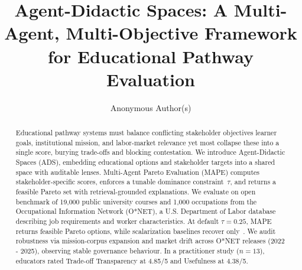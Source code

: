 \documentclass{article}
\title{Agent-Didactic Spaces: A Multi-Agent, Multi-Objective Framework for Educational Pathway Evaluation}
\author{
Anonymous Author(s)
}
\newcommand{\ADS}{\textsc{ADS}\xspace}
\newcommand{\MAPE}{\textsc{MAPE}\xspace}
\newcommand{\IndustryPartner}{\textit{industry partner (anonymized)}}
\begin{document}
\maketitle

\begin{abstract}
Educational pathway systems must balance conflicting stakeholder objectives learner goals, institutional mission, and labor-market relevance   yet most collapse these into a single score, burying trade-offs and blocking contestation.
We introduce Agent-Didactic Spaces (\ADS), embedding educational options and stakeholder targets into a shared space with auditable lenses. Multi-Agent Pareto Evaluation (\MAPE) computes stakeholder-specific scores, enforces a tunable dominance constraint~$\tau$, and returns a feasible Pareto set with retrieval-grounded explanations.
We evaluate on open benchmark of 19,000 public university courses and 1,000 occupations from the Occupational Information Network (O*NET), a U.S. Department of Labor database describing job requirements and worker characteristics. At default $\tau{=}0.25$, \MAPE returns \MainParetoSize  feasible Pareto options, while scalarization baselines recover only~{\BaselineOptima}. We audit robustness via mission-corpus expansion and market drift across O*NET releases (2022 - 2025), observing stable governance behaviour. In a practitioner study ($n{=}13$), educators rated {Trade-off Transparency} at {4.85/5} and {Usefulness} at {4.38/5}.
\end{abstract}


\end{document}
